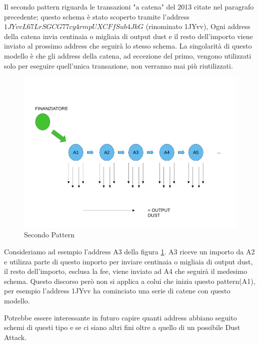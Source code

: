 Il secondo pattern riguarda le transazioni "a catena" del 2013 citate nel paragrafo precedente; questo schema è stato scoperto tramite l'address $1JYvvL67LrSGCG77cy4rmpUXCFfSub4JkG$ (rinominato 1JYvv), Ogni address della catena invia centinaia o migliaia di output dust e il resto dell'importo viene inviato al prossimo address che seguirà lo stesso schema. La singolarità di questo modello è che gli address della catena, ad eccezione del primo, vengono utilizzati solo per eseguire quell'unica transazione, non verranno mai più riutilizzati.
\begin{figure}[h!]
    \centering
    \includegraphics[scale=0.4]{Images/dust_attack2.pdf}
    \caption{Secondo Pattern}
    \label{fig:schema2}
\end{figure}
\FloatBarrier
Consideriamo ad esempio l'address A3 della figura \ref{fig:schema2}. A3 riceve un importo da A2 e utilizza parte di questo importo per inviare centinaia o migliaia di output dust, il resto dell'importo, esclusa la fee, viene inviato ad A4 che seguirà il medesimo schema. Questo discorso però non si applica a colui che inizia questo pattern(A1), per esempio l'address 1JYvv ha cominciato una serie di catene con questo modello.

Potrebbe essere interessante in futuro capire quanti address abbiano seguito schemi di questi tipo e se ci siano altri fini oltre a quello di un possibile Dust Attack.